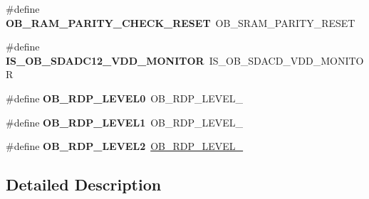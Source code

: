 \begin{DoxyCompactItemize}
\item 
\#define {\bfseries O\+B\+\_\+\+R\+A\+M\+\_\+\+P\+A\+R\+I\+T\+Y\+\_\+\+C\+H\+E\+C\+K\+\_\+\+R\+E\+S\+ET}~O\+B\+\_\+\+S\+R\+A\+M\+\_\+\+P\+A\+R\+I\+T\+Y\+\_\+\+R\+E\+S\+ET\hypertarget{group___h_a_l___f_l_a_s_h___aliased___defines_gab425a7c5a822ef819107a93463361bd9}{}\label{group___h_a_l___f_l_a_s_h___aliased___defines_gab425a7c5a822ef819107a93463361bd9}

\item 
\#define {\bfseries I\+S\+\_\+\+O\+B\+\_\+\+S\+D\+A\+D\+C12\+\_\+\+V\+D\+D\+\_\+\+M\+O\+N\+I\+T\+OR}~I\+S\+\_\+\+O\+B\+\_\+\+S\+D\+A\+C\+D\+\_\+\+V\+D\+D\+\_\+\+M\+O\+N\+I\+T\+OR\hypertarget{group___h_a_l___f_l_a_s_h___aliased___defines_gafc1560626d243a2c9fbd72dbb65c8941}{}\label{group___h_a_l___f_l_a_s_h___aliased___defines_gafc1560626d243a2c9fbd72dbb65c8941}

\item 
\#define {\bfseries O\+B\+\_\+\+R\+D\+P\+\_\+\+L\+E\+V\+E\+L0}~O\+B\+\_\+\+R\+D\+P\+\_\+\+L\+E\+V\+E\+L\+\_\hypertarget{group___h_a_l___f_l_a_s_h___aliased___defines_ga7339a05119a474a7bde67e9e500d38cb}{}\label{group___h_a_l___f_l_a_s_h___aliased___defines_ga7339a05119a474a7bde67e9e500d38cb}

\item 
\#define {\bfseries O\+B\+\_\+\+R\+D\+P\+\_\+\+L\+E\+V\+E\+L1}~O\+B\+\_\+\+R\+D\+P\+\_\+\+L\+E\+V\+E\+L\+\_\hypertarget{group___h_a_l___f_l_a_s_h___aliased___defines_ga7291ec039ae68ee1471af8ef3310d326}{}\label{group___h_a_l___f_l_a_s_h___aliased___defines_ga7291ec039ae68ee1471af8ef3310d326}

\item 
\#define {\bfseries O\+B\+\_\+\+R\+D\+P\+\_\+\+L\+E\+V\+E\+L2}~\hyperlink{group___f_l_a_s_h_ex___option___bytes___read___protection_ga2262afca565429ce2808d835c49e5ee6}{O\+B\+\_\+\+R\+D\+P\+\_\+\+L\+E\+V\+E\+L\+\_}\hypertarget{group___h_a_l___f_l_a_s_h___aliased___defines_gae591fa55ccad5cc27b322a5fba9d6ca1}{}\label{group___h_a_l___f_l_a_s_h___aliased___defines_gae591fa55ccad5cc27b322a5fba9d6ca1}

\end{DoxyCompactItemize}


\subsection{Detailed Description}
